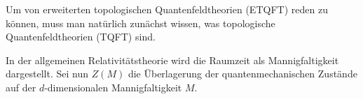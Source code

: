 


Um von erweiterten topologischen Quantenfeldtheorien (ETQFT) reden zu können,
muss man natürlich zunächst wissen, was topologische Quantenfeldtheorien (TQFT) sind.

In der allgemeinen Relativitätstheorie wird die Raumzeit als Mannigfaltigkeit dargestellt.
Sei nun $Z(M)$ die Überlagerung der quantenmechanischen Zustände auf der
$d$-dimensionalen Mannigfaltigkeit $M$.



